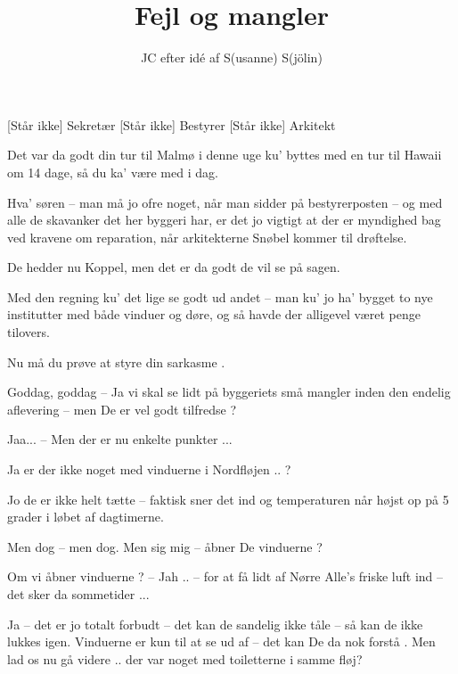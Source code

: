 \documentclass[a4paper,11pt]{article}
\title{Fejl og mangler}
\author{JC efter idé af S(usanne) S(jölin)}
\begin{document}
\maketitle

\begin{roles}
[Står ikke] Sekretær
[Står ikke] Bestyrer
[Står ikke] Arkitekt
\end{roles}


\begin{sketch}


 Det var da godt din tur til Malmø i denne uge ku' byttes med en tur
til Hawaii om 14 dage, så du ka' være med i dag.

 Hva' søren -- man må jo ofre noget, når man sidder på bestyrerposten
-- og med alle de skavanker det her byggeri har, er det jo vigtigt at der er
myndighed bag ved kravene om reparation, når arkitekterne Snøbel kommer til
drøftelse.

 De hedder nu Koppel, men det er da godt de vil se på sagen.

 Med den regning ku' det lige se godt ud andet -- man ku' jo ha'
bygget to nye institutter med både vinduer og døre, og så havde der alligevel
været penge tilovers.


 Nu må du prøve at styre din sarkasme .

 Goddag, goddag -- Ja vi skal se lidt på byggeriets små mangler inden
den endelig aflevering -- men De er vel godt tilfredse ?

 Jaa... -- Men der er nu enkelte punkter ...

 Ja er der ikke noget med vinduerne i Nordfløjen .. ?

 Jo de er ikke helt tætte -- faktisk sner det ind og temperaturen når
højst op på 5 grader i løbet af dagtimerne.

 Men dog -- men dog. Men sig mig -- åbner De vinduerne ?

 Om vi åbner vinduerne ? -- Jah .. -- for at få lidt af Nørre Alle's
friske luft ind -- det sker da sommetider ...

 Ja -- det er jo totalt forbudt -- det kan de sandelig ikke tåle -- så
kan de ikke lukkes igen.  Vinduerne er kun til at se ud af -- det kan De da nok
forstå . Men lad os nu gå videre .. der var noget med toiletterne i samme fløj?


\end{sketch}
\end{document}

